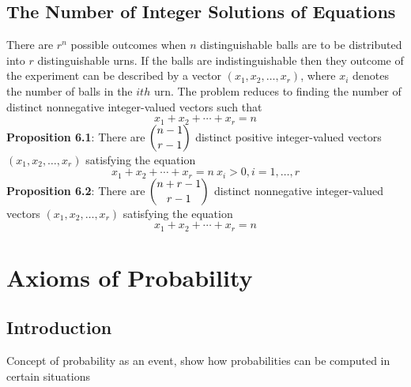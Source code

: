 \documentclass[openany]{book}
\numberwithin{equation}{section}
\begin{document}
\begin{flushleft}
\section{The Number of Integer Solutions of Equations}
There are $r^n$ possible outcomes when $n$ distinguishable balls are to be distributed into $r$ distinguishable urns. \medbreak
If the balls are indistinguishable then they outcome of the experiment can be described by a vector $(x_1,x_2,\dots,x_r)$, where $x_i$ denotes the number of balls in the $ith$ urn. \medbreak
The problem reduces to finding the number of distinct nonnegative integer-valued vectors such that \[x_1+x_2+\cdots+x_r=n\]
\textbf{Proposition 6.1}: There are $\dbinom{n-1}{r-1}$ distinct positive integer-valued vectors $(x_1,x_2,\dots,x_r)$ satisfying the equation \[x_1+x_2+\cdots+x_r = n \ x_i>0,i=1,\dots,r\] \medbreak
\textbf{Proposition 6.2}: There are $\dbinom{n+r-1}{r-1}$ distinct nonnegative integer-valued vectors $(x_1,x_2,\dots,x_r)$ satisfying the equation \[x_1+x_2+\cdots+x_r=n\]

\chapter{Axioms of Probability}
\section{Introduction}
Concept of probability as an event, show how probabilities can be computed in certain situations

\end{flushleft}
\end{document}
